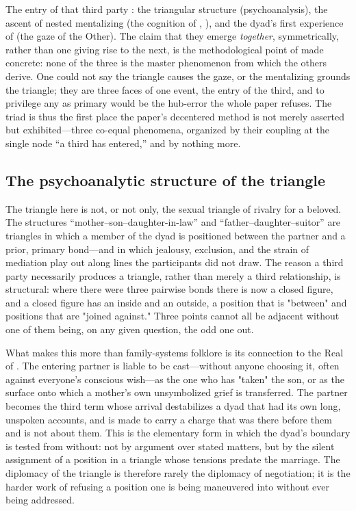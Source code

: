 The entry of that third party : the triangular structure (psychoanalysis), the ascent of nested mentalizing (the cognition of , ), and the dyad's first experience of  (the gaze of the Other). The claim that they emerge \emph{together}, symmetrically, rather than one giving rise to the next, is the methodological point of  made concrete: none of the three is the master phenomenon from which the others derive. One could not say the triangle causes the gaze, or the mentalizing grounds the triangle; they are three faces of one event, the entry of the third, and to privilege any as primary would be the hub-error the whole paper refuses. The triad is thus the first place the paper's decentered method is not merely asserted but exhibited---three co-equal phenomena, organized by their coupling at the single node ``a third has entered,'' and by nothing more.

\subsection{The psychoanalytic structure of the triangle}
The triangle here is not, or not only, the sexual triangle of rivalry for a beloved. The structures ``mother--son--daughter-in-law'' and ``father--daughter--suitor'' are triangles in which a member of the dyad is positioned between the partner and a prior, primary bond---and in which jealousy, exclusion, and the strain of mediation play out along lines the participants did not draw. The reason a third party necessarily produces a triangle, rather than merely a third relationship, is structural: where there were three pairwise bonds there is now a closed figure, and a closed figure has an inside and an outside, a position that is "between" and positions that are "joined against." Three points cannot all be adjacent without one of them being, on any given question, the odd one out.

What makes this more than family-systems folklore is its connection to the Real of . The entering partner is liable to be cast---without anyone choosing it, often against everyone's conscious wish---as the one who has "taken" the son, or as the surface onto which a mother's own unsymbolized grief is transferred. The partner becomes the third term whose arrival destabilizes a dyad that had its own long, unspoken accounts, and is made to carry a charge that was there before them and is not about them. This is the elementary form in which the dyad's boundary is tested from without: not by argument over stated matters, but by the silent assignment of a position in a triangle whose tensions predate the marriage. The diplomacy of the triangle is therefore rarely the diplomacy of negotiation; it is the harder work of refusing a position one is being maneuvered into without ever being addressed.

